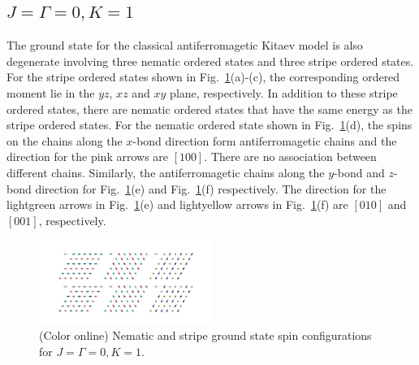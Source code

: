 \documentclass[aps,prb,reprint,amsfonts,amsmath,amssymb,showpacs,groupedaddress,superscriptaddress]{revtex4-1}
\begin{document}
\subsection{$J=\Gamma=0, K=1$}
The ground state for the classical antiferromagetic Kitaev model is also degenerate involving three nematic ordered states and three stripe ordered states. For the stripe ordered states shown in Fig.~\ref{fig:GSForPositiveK}(a)-(c), the corresponding ordered moment lie in the $yz$, $xz$ and $xy$ plane, respectively. In addition to these stripe ordered states, there are nematic ordered states that have the same energy as the stripe ordered states. For the nematic ordered state shown in Fig.~\ref{fig:GSForPositiveK}(d), the spins on the chains along the $x$-bond direction form antiferromagetic chains and the direction for the pink arrows are $[100]$. There are no association between different chains. Similarly, the antiferromagetic chains along the $y$-bond and $z$-bond direction for Fig.~\ref{fig:GSForPositiveK}(e) and Fig.~\ref{fig:GSForPositiveK}(f) respectively. The direction for the lightgreen arrows in Fig.~\ref{fig:GSForPositiveK}(e) and lightyellow arrows in Fig.~\ref{fig:GSForPositiveK}(f) are $[010]$ and $[001]$, respectively.
\begin{figure}
    \includegraphics[width=0.5\textwidth]{FigA3.pdf}
    \caption{\label{fig:GSForPositiveK}(Color online) Nematic and stripe ground state spin configurations for $J=\Gamma=0, K=1$.}
\end{figure}
\end{document}
